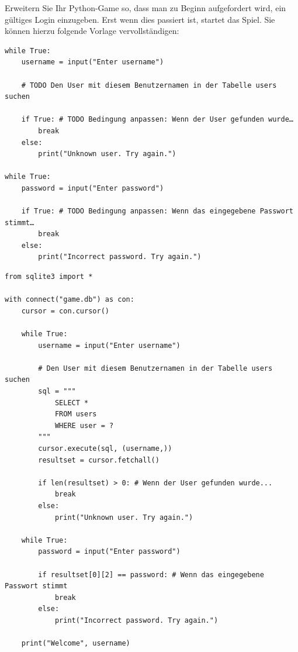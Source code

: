 \begin{myexercise}
    Erweitern Sie Ihr Python-Game so, dass man zu Beginn aufgefordert wird, ein gültiges Login einzugeben. Erst wenn dies passiert ist, startet das Spiel. Sie können hierzu folgende Vorlage vervollständigen:
    \begin{lstlisting}
while True:
    username = input("Enter username")

    # TODO Den User mit diesem Benutzernamen in der Tabelle users suchen

    if True: # TODO Bedingung anpassen: Wenn der User gefunden wurde…
        break
    else:
        print("Unknown user. Try again.")

while True:
    password = input("Enter password")

    if True: # TODO Bedingung anpassen: Wenn das eingegebene Passwort stimmt…
        break
    else:
        print("Incorrect password. Try again.")
\end{lstlisting}
    \begin{myanswer}
        \begin{lstlisting}
from sqlite3 import *

with connect("game.db") as con:
    cursor = con.cursor()

    while True:
        username = input("Enter username")

        # Den User mit diesem Benutzernamen in der Tabelle users suchen
        sql = """
            SELECT *
            FROM users
            WHERE user = ?
        """
        cursor.execute(sql, (username,))
        resultset = cursor.fetchall()

        if len(resultset) > 0: # Wenn der User gefunden wurde...
            break
        else:
            print("Unknown user. Try again.")

    while True:
        password = input("Enter password")

        if resultset[0][2] == password: # Wenn das eingegebene Passwort stimmt
            break
        else:
            print("Incorrect password. Try again.")

    print("Welcome", username)

\end{lstlisting}
    \end{myanswer}
\end{myexercise}

